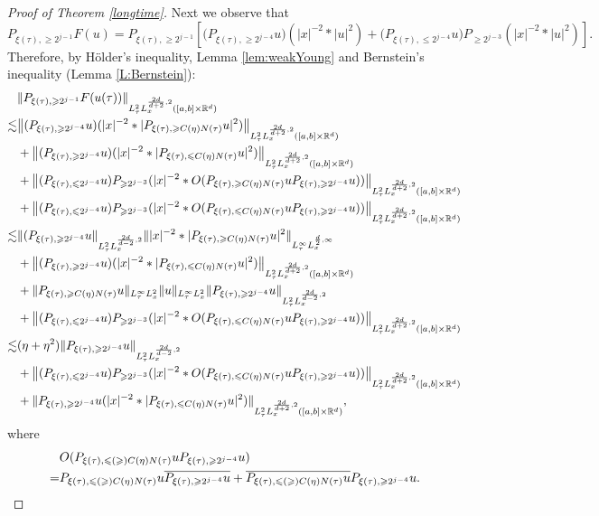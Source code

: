 \documentclass[reqno,11pt]{amsart}
\theoremstyle{plain}
\theoremstyle{definition}
\numberwithin{equation}{section}
\numberwithin{theorem}{section}
\def\geq{\geqslant}
\def\leq{\leqslant}
\def\R{\mathbb{R}}
\begin{document}
\begin{proof}[Proof of Theorem \ref{longtime}]
Next we observe that
\[P_{\xi(\tau),\geq 2^{j-1}}F(u)= P_{\xi(\tau),\geq 2^{j-1}}\left[\big(P_{\xi(\tau),\geq 2^{j-4}}u)(|x|^{-2}\ast|u|^2)+\big(P_{\xi(\tau),\leq 2^{j-4}}u\big)P_{\geq 2^{j-3}}(|x|^{-2}\ast|u|^2)\right].
\]
Therefore, by H\"older's inequality, Lemma \ref{lem:weakYoung} and Bernstein's inequality (Lemma \ref{L:Bernstein}):
\begin{align}\notag
&\|P_{\xi(\tau),\geq 2^{j-1}}F(u(\tau))\|_{L_{\tau}^2L_x^{\frac{2d}{d+2},2}([a,b]\times\R^d)}\\
\lesssim& \big\|(P_{\xi(\tau),\geq 2^{j-4}}u) (|x|^{-2}\ast|P_{\xi(\tau),\geq C(\eta)N(\tau)}u|^2)\big\|_{L_{\tau}^2L_x^{\frac{2d}{d+2},2}([a,b]\times\R^d)} \notag\\
&+\big\|(P_{\xi(\tau),\geq 2^{j-4}}u) (|x|^{-2}\ast|P_{\xi(\tau),\leq C(\eta)N(\tau)}u|^2)\big\|_{L_{\tau}^2L_x^{\frac{2d}{d+2},2}([a,b]\times\R^d)}\notag\\
&+\big\|(P_{\xi(\tau),\leq 2^{j-4}}u)P_{\geq 2^{j-3}}(|x|^{-2}\ast O(P_{\xi(\tau),\geq C(\eta)N(\tau)}uP_{\xi(\tau),\geq 2^{j-4}}u))\big\|_{L_{\tau}^2L_x^{\frac{2d}{d+2},2}([a,b]\times\R^d)}\notag\\
&+\big\|(P_{\xi(\tau),\leq 2^{j-4}}u)P_{\geq 2^{j-3}}(|x|^{-2}\ast O(P_{\xi(\tau),\leq C(\eta)N(\tau)}uP_{\xi(\tau),\geq 2^{j-4}}u))\big\|_{L_{\tau}^2L_x^{\frac{2d}{d+2},2}([a,b]\times\R^d)}\notag\\
\lesssim& \|(P_{\xi(\tau),\geq 2^{j-4}}u\|_{L_{\tau}^2L_x^{\frac{2d}{d-2},2}}\||x|^{-2}\ast |P_{\xi(\tau),\geq C(\eta)N(\tau)}u|^2\|_{L_{\tau}^{\infty}L_x^{\frac{d}{2},\infty}}\notag\\
&+\big\|(P_{\xi(\tau),\geq 2^{j-4}}u) (|x|^{-2}\ast|P_{\xi(\tau),\leq C(\eta)N(\tau)}u|^2)\big\|_{L_{\tau}^2L_x^{\frac{2d}{d+2},2}([a,b]\times\R^d)}\notag\\
&+\|P_{\xi(\tau),\geq C(\eta)N(\tau)}u\|_{L_{\tau}^{\infty}L_x^{2}}\|u\|_{L_{\tau}^{\infty}L_x^2}\|P_{\xi(\tau),\geq 2^{j-4}}u\|_{L_{\tau}^2L_x^{\frac{2d}{d-2},2}}\notag\\
&+\big\|(P_{\xi(\tau),\leq 2^{j-4}}u)P_{\geq 2^{j-3}}(|x|^{-2}\ast O(P_{\xi(\tau),\leq C(\eta)N(\tau)}uP_{\xi(\tau),\geq 2^{j-4}}u))\big\|_{L_{\tau}^2L_x^{\frac{2d}{d+2},2}([a,b]\times\R^d)}\notag\\
\lesssim& (\eta+\eta^2)\|P_{\xi(\tau),\geq 2^{j-4}}u\|_{L_{\tau}^{2}L_x^{\frac{2d}{d-2},2}}\notag\\
&+\big\|(P_{\xi(\tau),\leq 2^{j-4}}u)P_{\geq 2^{j-3}}(|x|^{-2}\ast O(P_{\xi(\tau),\leq C(\eta)N(\tau)}uP_{\xi(\tau),\geq 2^{j-4}}u))\big\|_{L_{\tau}^2L_x^{\frac{2d}{d+2},2}([a,b]\times\R^d)}\notag\\
&+\|P_{\xi(\tau),\geq 2^{j-4}}u (|x|^{-2}\ast|P_{\xi(\tau),\leq C(\eta)N(\tau)}u|^2)\|_{L_{\tau}^2L_x^{\frac{2d}{d+2},2}([a,b]\times\R^d)},\label{estq}
\end{align}
where 
\begin{align*}
&O(P_{\xi(\tau),\leq(\geq) C(\eta)N(\tau)}uP_{\xi(\tau),\geq 2^{j-4}}u)\notag\\
=&P_{\xi(\tau),\leq(\geq) C(\eta)N(\tau)}u\overline{P_{\xi(\tau),\geq 2^{j-4}}u}+\overline{P_{\xi(\tau),\leq(\geq) C(\eta)N(\tau)}u}P_{\xi(\tau),\geq 2^{j-4}}u.
\end{align*}


\end{proof}
\end{document}
